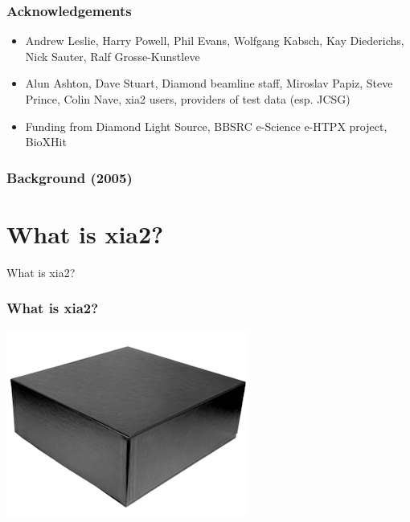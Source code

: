 \documentclass[slides,compress]{beamer}
\begin{document}
\begin{frame}
\frametitle{Acknowledgements}
\begin{itemize}
\item{Andrew Leslie, Harry Powell, Phil Evans, Wolfgang Kabsch, Kay Diederichs,
Nick Sauter, Ralf Grosse-Kunstleve}
\item{Alun Ashton, Dave Stuart, Diamond beamline staff, Miroslav Papiz, 
Steve Prince, Colin Nave, xia2 users, providers of test data (esp. JCSG)}
\item{Funding from Diamond Light Source, BBSRC e-Science e-HTPX project, 
BioXHit}
\end{itemize}
\end{frame}

\begin{frame}
\frametitle{Background (2005)}
\begin{itemize}
\end{itemize}
\end{frame}

\section{What is xia2?}

\begin{frame}
\begin{center}
\Huge What is xia2?
\end{center}
\end{frame}

\begin{frame}
\frametitle{What is xia2?}
\includegraphics[scale=1]{figures/blackbox.png}
\end{frame}
\end{document}
